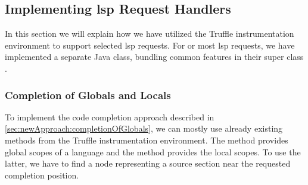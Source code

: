 \subsection{Implementing \acs{lsp} Request Handlers}
In this section we will explain how we have utilized the Truffle instrumentation environment to support selected \ac{lsp} requests. For or most \ac{lsp} requests, we have implemented a separate Java class, bundling common features in their super class .

\subsubsection{Completion of Globals and Locals}
\label{sec:impl:completionGlobalsLocals}
    To implement the code completion approach described in \autoref{sec:newApproach:completionOfGlobals}, we can mostly use already existing methods from the Truffle instrumentation environment. The method  provides global scopes of a language and the method  provides the local scopes. To use the latter, we have to find a node representing a source section near the requested completion position.
    
